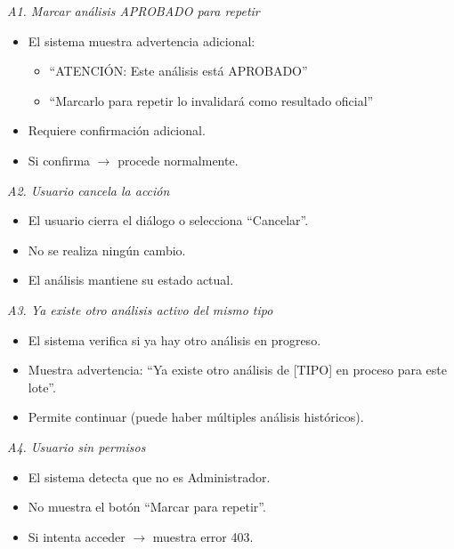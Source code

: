 \vspace{0.3em}
\noindent\textit{A1. Marcar análisis APROBADO para repetir}
\begin{itemize}[nosep]
    \item El sistema muestra advertencia adicional:
    \begin{itemize}[nosep]
        \item ``ATENCIÓN: Este análisis está APROBADO''
        \item ``Marcarlo para repetir lo invalidará como resultado oficial''
    \end{itemize}
    \item Requiere confirmación adicional.
    \item Si confirma $\rightarrow$ procede normalmente.
\end{itemize}

\vspace{0.3em}
\noindent\textit{A2. Usuario cancela la acción}
\begin{itemize}[nosep]
    \item El usuario cierra el diálogo o selecciona ``Cancelar''.
    \item No se realiza ningún cambio.
    \item El análisis mantiene su estado actual.
\end{itemize}

\vspace{0.3em}
\noindent\textit{A3. Ya existe otro análisis activo del mismo tipo}
\begin{itemize}[nosep]
    \item El sistema verifica si ya hay otro análisis en progreso.
    \item Muestra advertencia: ``Ya existe otro análisis de [TIPO] en proceso para este lote''.
    \item Permite continuar (puede haber múltiples análisis históricos).
\end{itemize}

\vspace{0.3em}
\noindent\textit{A4. Usuario sin permisos}
\begin{itemize}[nosep]
    \item El sistema detecta que no es Administrador.
    \item No muestra el botón ``Marcar para repetir''.
    \item Si intenta acceder $\rightarrow$ muestra error 403.
\end{itemize}

